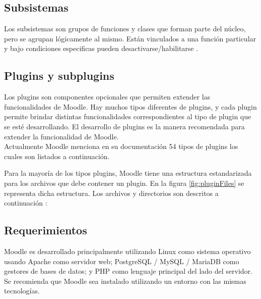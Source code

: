 \subsection{Subsistemas}
Los subsistemas son grupos de funciones y clases que forman parte del núcleo, pero se agrupan lógicamente al mismo. Están vinculados a una función particular y bajo condiciones especificas pueden desactivarse/habilitarse \cite{moodleComponets}.
    
\subsection{Plugins y subplugins}\label{subsec:plugins}
Los plugins son componentes opcionales que permiten extender las funcionalidades de Moodle. Hay muchos tipos diferentes de plugins, y cada plugin permite brindar distintas funcionalidades correspondientes al tipo de plugin que se esté desarrollando. El desarrollo de plugins es la manera recomendada para extender la funcionalidad de Moodle.\\

\noindent Actualmente Moodle menciona en su documentación 54 tipos de plugins los cuales son listados a continuación.

\begin{multicols}{3}
    
\end{multicols}

\clearpage
\noindent Para la mayoría de los tipos plugins, Moodle tiene una estructura estandarizada para los archivos que debe contener un plugin. En la figura \ref{fig:pluginFiles} se representa dicha estructura. Los archivos y directorios son descritos a continuación \cite{moodlePluginfiles}:


\begin{quote}

\end{quote}

\subsection{Requerimientos}

Moodle es desarrollado principalmente utilizando Linux como sistema operativo usando Apache como servidor web; PostgreSQL / MySQL / MariaDB como gestores de bases de datos; y PHP como lenguaje principal del lado del servidor. Se recomienda que Moodle sea instalado utilizando un entorno con las mismas tecnologías. \cite{moodleInstall} \\


